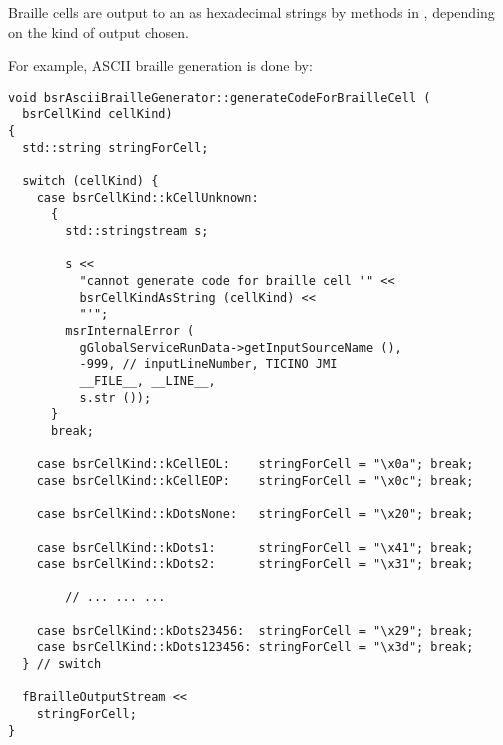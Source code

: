 Braille cells are output to an  as hexadecimal strings by  methods in , depending on the kind of output chosen.

For example, ASCII braille generation is done by:
\begin{lstlisting}[language=CPlusPlus]
void bsrAsciiBrailleGenerator::generateCodeForBrailleCell (
  bsrCellKind cellKind)
{
  std::string stringForCell;

  switch (cellKind) {
    case bsrCellKind::kCellUnknown:
      {
        std::stringstream s;

        s <<
          "cannot generate code for braille cell '" <<
          bsrCellKindAsString (cellKind) <<
          "'";
        msrInternalError (
          gGlobalServiceRunData->getInputSourceName (),
          -999, // inputLineNumber, TICINO JMI
          __FILE__, __LINE__,
          s.str ());
      }
      break;

    case bsrCellKind::kCellEOL:    stringForCell = "\x0a"; break;
    case bsrCellKind::kCellEOP:    stringForCell = "\x0c"; break;

    case bsrCellKind::kDotsNone:   stringForCell = "\x20"; break;

    case bsrCellKind::kDots1:      stringForCell = "\x41"; break;
    case bsrCellKind::kDots2:      stringForCell = "\x31"; break;

		// ... ... ...

    case bsrCellKind::kDots23456:  stringForCell = "\x29"; break;
    case bsrCellKind::kDots123456: stringForCell = "\x3d"; break;
  } // switch

  fBrailleOutputStream <<
    stringForCell;
}
\end{lstlisting}

